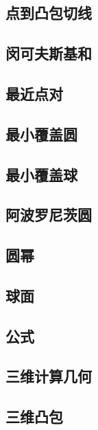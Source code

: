 \documentclass[titlepage,a4paper,10pt]{article}
\begin{document}
\begin{multicols}{2}
\begin{spacing}{0.8}
			\subsection{点到凸包切线}
				
			\subsection{闵可夫斯基和}
				
			\subsection{最近点对}
				
			\subsection{最小覆盖圆}
				
			\subsection{最小覆盖球}
				
			\subsection{阿波罗尼茨圆}
				
			\subsection{圆幂}
				
			\subsection{球面}
				
			\subsection{公式}
				
			\subsection{三维计算几何}
				
			\subsection{三维凸包}
				


\end{spacing}
\end{multicols}
\end{document}
